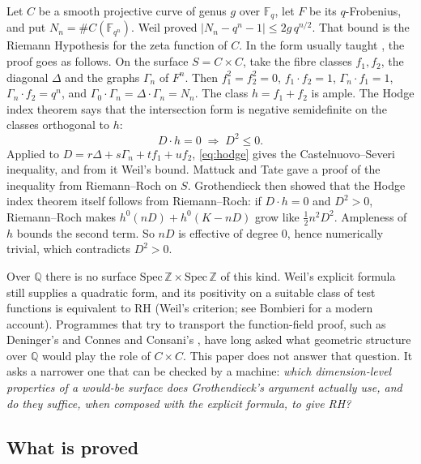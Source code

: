 \documentclass[11pt]{article}
\theoremstyle{definition}
\newcommand{\Z}{\mathbb{Z}}
\newcommand{\Q}{\mathbb{Q}}
\newcommand{\F}{\mathbb{F}}
\begin{document}
Let $C$ be a smooth projective curve of genus $g$ over $\F_q$, let $F$ be its $q$-Frobenius, and put $N_n = \#C(\F_{q^n})$. Weil \cite{Weil48} proved $|N_n - q^n - 1| \le 2g\,q^{n/2}$. That bound is the Riemann Hypothesis for the zeta function of $C$. In the form usually taught \cite[Ex.~V.1.10]{Hartshorne}, the proof goes as follows. On the surface $S = C \times C$, take the fibre classes $f_1, f_2$, the diagonal $\Delta$ and the graphs $\Gamma_n$ of $F^n$. Then $f_1^2 = f_2^2 = 0$, $f_1\cdot f_2 = 1$, $\Gamma_n \cdot f_1 = 1$, $\Gamma_n\cdot f_2 = q^n$, and $\Gamma_0\cdot\Gamma_n = \Delta\cdot\Gamma_n = N_n$. The class $h = f_1 + f_2$ is ample. The Hodge index theorem \cite[Thm.~V.1.9]{Hartshorne} says that the intersection form is negative semidefinite on the classes orthogonal to $h$:
\begin{equation}\label{eq:hodge}
D\cdot h = 0 \;\Longrightarrow\; D^2 \le 0 .
\end{equation}
Applied to $D = r\Delta + s\Gamma_n + t f_1 + u f_2$, \eqref{eq:hodge} gives the Castelnuovo--Severi inequality, and from it Weil's bound. Mattuck and Tate \cite{MT} gave a proof of the inequality from Riemann--Roch on $S$. Grothendieck \cite{Groth} then showed that the Hodge index theorem itself follows from Riemann--Roch: if $D\cdot h = 0$ and $D^2 > 0$, Riemann--Roch makes $h^0(nD) + h^0(K - nD)$ grow like $\tfrac12 n^2 D^2$. Ampleness of $h$ bounds the second term. So $nD$ is effective of degree $0$, hence numerically trivial, which contradicts $D^2 > 0$.

Over $\Q$ there is no surface $\mathrm{Spec}\,\Z \times \mathrm{Spec}\,\Z$ of this kind. Weil's explicit formula \cite{Weil52} still supplies a quadratic form, and its positivity on a suitable class of test functions is equivalent to RH (Weil's criterion; see Bombieri \cite{Bombieri} for a modern account). Programmes that try to transport the function-field proof, such as Deninger's \cite{Deninger} and Connes and Consani's \cite{Connes99,ConnesEssay,CCArith,CCScaling,CCRR}, have long asked what geometric structure over $\Q$ would play the role of $C\times C$. This paper does not answer that question. It asks a narrower one that can be checked by a machine: \emph{which dimension-level properties of a would-be surface does Grothendieck's argument actually use, and do they suffice, when composed with the explicit formula, to give RH?}

\subsection{What is proved}
\end{document}
